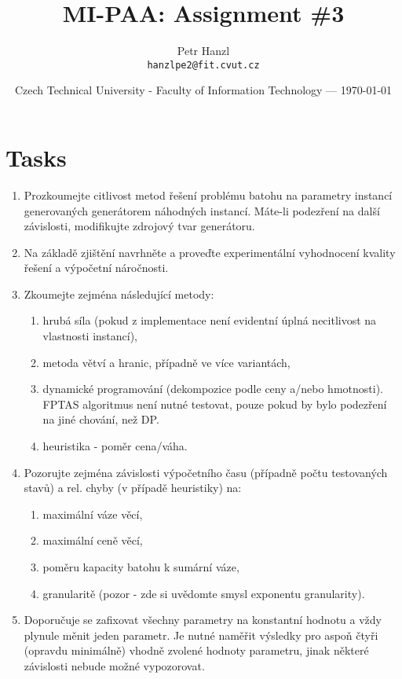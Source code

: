 \documentclass{article}
\title{MI-PAA: Assignment \#3} %
\author{Petr Hanzl\\ \texttt{hanzlpe2@fit.cvut.cz}} %
\date{Czech Technical University - Faculty of Information Technology --- \today} %
\begin{document}
\maketitle %

\section*{Tasks}
	\begin{enumerate}
		\item Prozkoumejte citlivost metod řešení problému batohu na parametry instancí generovaných generátorem náhodných instancí. Máte-li podezření na další závislosti, modifikujte zdrojový tvar generátoru.
		\item Na základě zjištění navrhněte a proveďte experimentální vyhodnocení kvality řešení a výpočetní náročnosti.
		\item Zkoumejte zejména následující metody:
		\begin{enumerate}
			\item hrubá síla (pokud z implementace není evidentní úplná necitlivost na vlastnosti instancí),
			\item metoda větví a hranic, případně ve více variantách,
			\item dynamické programování (dekompozice podle ceny a/nebo hmotnosti). FPTAS algoritmus není nutné testovat, pouze pokud by bylo podezření na jiné chování, než DP.
			\item heuristika - poměr cena/váha.
		\end{enumerate}
		\item Pozorujte zejména závislosti výpočetního času (případně počtu testovaných stavů) a rel. chyby (v případě heuristiky) na:
		\begin{enumerate}
			\item maximální váze věcí,
			\item maximální ceně věcí,
			\item poměru kapacity batohu k sumární váze,
			\item granularitě (pozor - zde si uvědomte smysl exponentu granularity).
		\end{enumerate}
		\item Doporučuje se zafixovat všechny parametry na konstantní hodnotu a vždy plynule měnit jeden parametr. Je nutné naměřit výsledky pro aspoň čtyři (opravdu minimálně) vhodně zvolené hodnoty parametru, jinak některé závislosti nebude možné vypozorovat.
	\end{enumerate}
\end{document}
